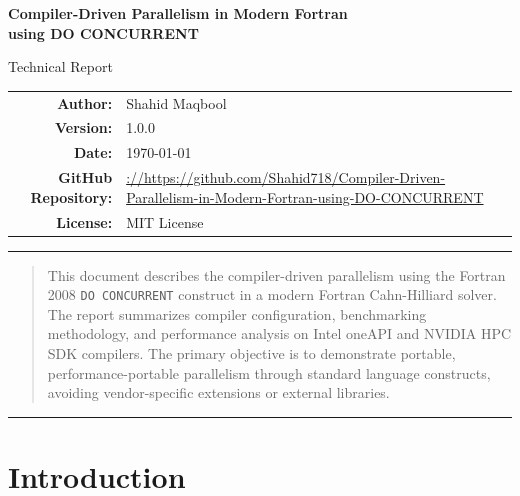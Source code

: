 \documentclass[11pt,a4paper]{article}
\begin{document}
	
	\begin{titlepage}
		\centering
		\vspace*{1cm}
		
		\Huge
		\textbf{Compiler-Driven Parallelism in Modern Fortran}\\[0.5cm]
		\textbf{using DO CONCURRENT}
		
		\vspace{0.5cm}
		\Large
		Technical Report
		
		\vspace{2cm}
		
		\normalsize

		
		\begin{tabular}{rl}
			\textbf{Author:} & Shahid Maqbool \\
			\textbf{Version:} & 1.0.0 \\
			\textbf{Date:} & \today \\
			\textbf{GitHub Repository:} & \parbox{0.5\textwidth}{\href{https://github.com}{://https://github.com/Shahid718/Compiler-Driven-Parallelism-in-Modern-Fortran-using-DO-CONCURRENT}} \\
			\textbf{License:} & MIT License
		\end{tabular}
		
		\vspace{3cm}
		
		\rule{0.8\textwidth}{0.4pt}
		
		\vspace{0.5cm}
		\begin{abstract}
			\noindent
			This document describes the compiler-driven parallelism using the Fortran 2008 \texttt{DO CONCURRENT} construct in a modern Fortran Cahn-Hilliard solver. The report summarizes compiler configuration, benchmarking methodology, and performance analysis on Intel oneAPI and NVIDIA HPC SDK compilers. The primary objective is to demonstrate portable, performance-portable parallelism through standard language constructs, avoiding vendor-specific extensions or external libraries.
		\end{abstract}
		\rule{0.8\textwidth}{0.4pt}
		
		\vfill
	\end{titlepage}
	

	\clearpage
	\section{Introduction}
	\label{sec:introduction}
	
\end{document}
